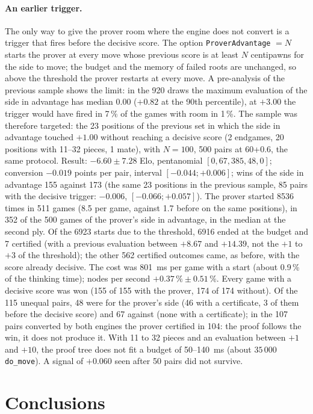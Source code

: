 \documentclass{article}
\theoremstyle{plain}
\theoremstyle{definition}
\theoremstyle{remark}
\newcommand{\code}[1]{\texttt{#1}}
\begin{document}
\paragraph{An earlier trigger.} The only way to give the prover room where the engine does not convert is a trigger that fires before the decisive score. The option \code{ProverAdvantage} $= N$ starts the prover at every move whose previous score is at least $N$ centipawns for the side to move; the budget and the memory of failed roots are unchanged, so above the threshold the prover restarts at every move. A pre-analysis of the previous sample shows the limit: in the 920 draws the maximum evaluation of the side in advantage has median $0.00$ ($+0.82$ at the 90th percentile), at $+3.00$ the trigger would have fired in 7\,\% of the games with room in 1\,\%. The sample was therefore targeted: the 23 positions of the previous set in which the side in advantage touched $+1.00$ without reaching a decisive score (2 endgames, 20 positions with 11--32 pieces, 1 mate), with $N = 100$, 500 pairs at 60+0.6, the same protocol. Result: $-6.60 \pm 7.28$ Elo, pentanomial $[0, 67, 385, 48, 0]$; conversion $-0.019$ points per pair, interval $[-0.044; +0.006]$; wins of the side in advantage 155 against 173 (the same 23 positions in the previous sample, 85 pairs with the decisive trigger: $-0.006$, $[-0.066; +0.057]$). The prover started 8536 times in 511 games (8.5 per game, against 1.7 before on the same positions), in 352 of the 500 games of the prover's side in advantage, in the median at the second ply. Of the 6923 starts due to the threshold, 6916 ended at the budget and 7 certified (with a previous evaluation between $+8.67$ and $+14.39$, not the $+1$ to $+3$ of the threshold); the other 562 certified outcomes came, as before, with the score already decisive. The cost was 801~ms per game with a start (about 0.9\,\% of the thinking time); nodes per second $+0.37\,\% \pm 0.51\,\%$. Every game with a decisive score was won (155 of 155 with the prover, 174 of 174 without). Of the 115 unequal pairs, 48 were for the prover's side (46 with a certificate, 3 of them before the decisive score) and 67 against (none with a certificate); in the 107 pairs converted by both engines the prover certified in 104: the proof follows the win, it does not produce it. With 11 to 32 pieces and an evaluation between $+1$ and $+10$, the proof tree does not fit a budget of 50--140~ms (about $35\,000$ \code{do\_move}). A signal of $+0.060$ seen after 50 pairs did not survive.

\section{Conclusions}\label{sec:conclusions}
\end{document}
